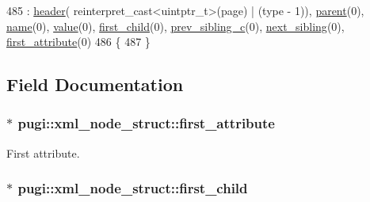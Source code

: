 \begin{DoxyCode}
485                                                                       : \hyperlink{structpugi_1_1xml__node__struct_aea2e405a368dc5a278a2d23465f1975c}{header}(
      reinterpret\_cast<uintptr\_t>(page) | (type - 1)), \hyperlink{structpugi_1_1xml__node__struct_af692c222bcc5a9f61108cb3ae0b7b5ea}{parent}(0), \hyperlink{structpugi_1_1xml__node__struct_ae2324fdbd1e307fb12007d1d0f957a0b}{name}(0), \hyperlink{structpugi_1_1xml__node__struct_a191e708864fccda17bb66157afdadd2d}{value}(0), 
      \hyperlink{structpugi_1_1xml__node__struct_af72c49a0f81928ef664d9d2f0260f23d}{first\_child}(0), \hyperlink{structpugi_1_1xml__node__struct_a74e62128c88c422c0ed969633bbb2d4e}{prev\_sibling\_c}(0), \hyperlink{structpugi_1_1xml__node__struct_acf0867e3a77871e37132046d97398a6d}{next\_sibling}(0), 
      \hyperlink{structpugi_1_1xml__node__struct_a482d2daf97ce0745661cb2c57d8f6fb3}{first\_attribute}(0)
486         \{
487         \}
\end{DoxyCode}


\subsection{Field Documentation}
\hypertarget{structpugi_1_1xml__node__struct_a482d2daf97ce0745661cb2c57d8f6fb3}{
\subsubsection[{first\-\_\-attribute}]{$\ast$ pugi\-::xml\-\_\-node\-\_\-struct\-::first\-\_\-attribute}}\label{structpugi_1_1xml__node__struct_a482d2daf97ce0745661cb2c57d8f6fb3}


First attribute. 

\hypertarget{structpugi_1_1xml__node__struct_af72c49a0f81928ef664d9d2f0260f23d}{
\subsubsection[{first\-\_\-child}]{$\ast$ pugi\-::xml\-\_\-node\-\_\-struct\-::first\-\_\-child}}\label{structpugi_1_1xml__node__struct_af72c49a0f81928ef664d9d2f0260f23d}


